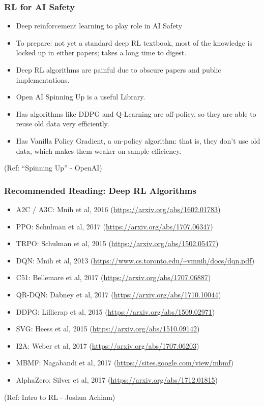 \begin{frame}\frametitle{RL for AI Safety}

\begin{itemize}
\item Deep reinforcement learning to play role in AI Safety
\item To prepare: not yet a standard deep RL textbook, most of the knowledge is locked up in either papers; takes a long time to digest.
\item Deep RL algorithms are painful due to obscure papers and public implementations.
\item Open AI Spinning Up is a useful Library.
\item Has algorithms like DDPG and Q-Learning are off-policy, so they are able to reuse old data very efficiently. 
\item Has Vanilla Policy Gradient, a on-policy algorithm: that is, they don’t use old data, which makes them weaker on sample efficiency. 
\end{itemize}

{\tiny (Ref: ``Spinning Up'' - OpenAI)}

\end{frame}

\begin{frame}[fragile]\frametitle{Recommended Reading: Deep RL Algorithms}

\begin{itemize}
\item A2C / A3C: Mnih et al, 2016 (\url{https://arxiv.org/abs/1602.01783})
\item PPO: Schulman et al, 2017 (\url{https://arxiv.org/abs/1707.06347})
\item TRPO: Schulman et al, 2015 (\url{https://arxiv.org/abs/1502.05477})
\item DQN: Mnih et al, 2013 (\url{https://www.cs.toronto.edu/~vmnih/docs/dqn.pdf})
\item C51: Bellemare et al, 2017 (\url{https://arxiv.org/abs/1707.06887})
\item QR-DQN: Dabney et al, 2017 (\url{https://arxiv.org/abs/1710.10044})
\item DDPG: Lillicrap et al, 2015 (\url{https://arxiv.org/abs/1509.02971})
\item SVG: Heess et al, 2015 (\url{https://arxiv.org/abs/1510.09142})
\item I2A: Weber et al, 2017 (\url{https://arxiv.org/abs/1707.06203})
\item MBMF: Nagabandi et al, 2017 (\url{https://sites.google.com/view/mbmf})
\item AlphaZero: Silver et al, 2017 (\url{https://arxiv.org/abs/1712.01815})
\end{itemize}
{\tiny (Ref: Intro to RL - Joshua Achiam)}


\end{frame}
